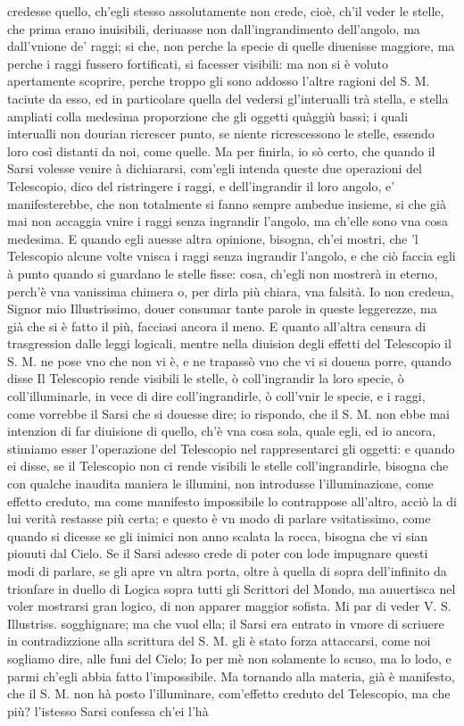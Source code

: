 \documentclass[11pt,twoside,openany]{book}
\begin{document}
credesse quello, ch'egli stesso assolutamente non crede, cioè, ch'il veder le stelle, che prima erano inuisibili, deriuasse non dall'ingrandimento dell'angolo, ma dall'vnione de' raggi; si che, non perche la specie di quelle diuenisse maggiore, ma perche i raggi fussero fortificati, si facesser visibili: ma non si è voluto apertamente scoprire, perche troppo gli sono addosso l'altre ragioni del S. M. taciute da esso, ed in particolare quella del vedersi gl'interualli trà stella, e stella ampliati colla medesima proporzione che gli oggetti quàggiù bassi; i quali interualli non dourian ricrescer punto, se niente ricrescessono le stelle, essendo loro così distanti da noi, come quelle. Ma per finirla, io sò certo, che quando il Sarsi volesse venire à dichiararsi, com'egli intenda queste due operazioni del Telescopio, dico del ristringere i raggi, e dell'ingrandir il loro angolo, e' manifesterebbe, che non totalmente si fanno sempre ambedue insieme, si che già mai non accaggia vnire i raggi senza ingrandir l'angolo, ma ch'elle sono vna cosa medesima. E quando egli auesse altra opinione, bisogna, ch'ei mostri, che 'l Telescopio alcune volte vnisca i raggi senza ingrandir l'angolo, e che ciò faccia egli à punto quando si guardano le stelle fisse: cosa, ch'egli non mostrerà in eterno, perch'è vna vanissima chimera o, per dirla più chiara, vna falsità. Io non credeua, Signor mio Illustrissimo, douer consumar tante parole in queste leggerezze, ma già che si è fatto il più, facciasi ancora il meno. E quanto all'altra censura di trasgression dalle leggi logicali, mentre nella diuision degli effetti del Telescopio il S. M. ne pose vno che non vi è, e ne trapassò vno che vi si doueua porre, quando disse Il Telescopio rende visibili le stelle, ò coll'ingrandir la loro specie, ò coll'illuminarle, in vece di dire coll'ingrandirle, ò coll'vnir le specie, e i raggi, come vorrebbe il Sarsi che si douesse dire; io rispondo, che il S. M. non ebbe mai intenzion di far diuisione di quello, ch'è vna cosa sola, quale egli, ed io ancora, stimiamo esser l'operazione del Telescopio nel rappresentarci gli oggetti: e quando ei disse, se il Telescopio non ci rende visibili le stelle coll'ingrandirle, bisogna che con qualche inaudita maniera le illumini, non introdusse l'illuminazione, come effetto creduto, ma come manifesto impossibile lo contrappose all'altro, acciò la di lui verità restasse più certa; e questo è vn modo di parlare vsitatissimo, come quando si dicesse se gli inimici non anno scalata la rocca, bisogna che vi sian piouuti dal Cielo. Se il Sarsi adesso crede di poter con lode impugnare questi modi di parlare, se gli apre vn altra porta, oltre à quella di sopra dell'infinito da trionfare in duello di Logica sopra tutti gli Scrittori del Mondo, ma auuertisca nel voler mostrarsi gran logico, di non apparer maggior sofista. Mi par di veder V. S. Illustriss. sogghignare; ma che vuol ella; il Sarsi era entrato in vmore di scriuere in contradizzione alla scrittura del S. M. gli è stato forza attaccarsi, come noi sogliamo dire, alle funi del Cielo; Io per mè non solamente lo scuso, ma lo lodo, e parmi ch'egli abbia fatto l'impossibile. Ma tornando alla materia, già è manifesto, che il S. M. non hà posto l'illuminare, com'effetto creduto del Telescopio, ma che più? l'istesso Sarsi confessa ch'ei l'hà 
\end{document}
